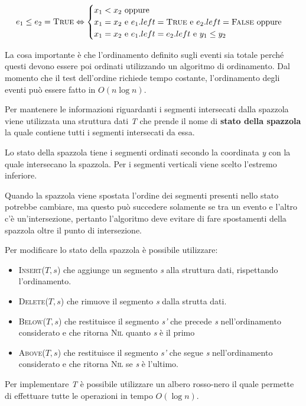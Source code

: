 $$
e_1 \leq e_2 = \textsc{True} \Leftrightarrow \begin{cases}
x_1 < x_2  \text{ oppure }\\
x_1 = x_2 \text{ e } e_1.left = \textsc{True} \text{ e } e_2.left = \textsc{False} \text{ oppure} \\
x_1 = x_2 \text{ e } e_1.left = e_2.left \text{ e } y_1 \leq y_2
\end{cases}
$$

La cosa importante è che l'ordinamento definito sugli eventi sia totale perché questi devono essere poi ordinati utilizzando un algoritmo di ordinamento. 
Dal momento che il test dell'ordine richiede tempo costante, l'ordinamento degli eventi può essere fatto in $O(n \log n)$.

Per mantenere le informazioni riguardanti i segmenti intersecati dalla spazzola viene utilizzata una struttura dati \emph{T} che prende il nome di \textbf{stato della spazzola} la quale contiene tutti i segmenti intersecati da essa.

Lo stato della spazzola tiene i segmenti ordinati secondo la coordinata \emph{y} con la quale intersecano la spazzola. 
Per i segmenti verticali viene scelto l'estremo inferiore.

Quando la spazzola viene spostata l'ordine dei segmenti presenti nello stato potrebbe cambiare, ma questo può succedere solamente se tra un evento e l'altro c'è un'intersezione, pertanto l'algoritmo deve evitare di fare spostamenti della spazzola oltre il punto di intersezione.

Per modificare lo stato della spazzola è possibile utilizzare:

\begin{itemize}
\item
  \textsc{Insert($T,s$)} che aggiunge un segmento \emph{s} alla struttura dati, rispettando l'ordinamento.
\item
  \textsc{Delete($T,s$)} che rimuove il segmento \emph{s} dalla strutta dati.
\item
  \textsc{Below($T,s$)} che restituisce il segmento \emph{s'} che precede \emph{s} nell'ordinamento considerato e che ritorna \textsc{Nil} quanto \emph{s} è il primo
\item
  \textsc{Above($T,s$)} che restituisce il segmento \emph{s'} che segue \emph{s} nell'ordinamento considerato e che ritorna \textsc{Nil} se \emph{s} è l'ultimo.
\end{itemize}

Per implementare \emph{T} è possibile utilizzare un albero rosso-nero il quale permette di effettuare tutte le operazioni in tempo $O(\log n)$.

